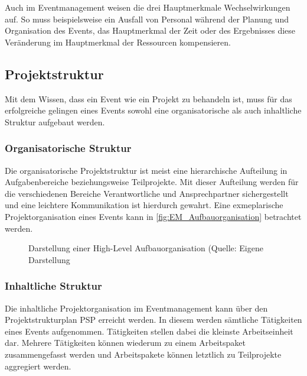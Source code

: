 Auch im Eventmanagement weisen die drei Hauptmerkmale Wechselwirkungen auf.
So muss beispielsweise ein Ausfall von Personal während der Planung und Organisation des Events, das Hauptmerkmal der Zeit oder des Ergebnisses diese Veränderung im Hauptmerkmal der Ressourcen kompensieren. 


\subsection{Projektstruktur}
Mit dem Wissen, dass ein Event wie ein Projekt zu behandeln ist, muss für das erfolgreiche gelingen eines Events sowohl eine organisatorische als auch inhaltliche Struktur aufgebaut werden.

\subsubsection{Organisatorische Struktur}
Die organisatorische Projektstruktur ist meist eine hierarchische Aufteilung in Aufgabenbereiche beziehungsweise Teilprojekte.
Mit dieser Aufteilung werden für die verschiedenen Bereiche Verantwortliche und Ansprechpartner sichergestellt und eine leichtere Kommunikation ist hierdurch gewahrt.
Eine exmeplarische Projektorganisation eines Events kann in \autoref{fig:EM_Aufbauorganisation} betrachtet werden.\autocite[Vgl.][S. 144 f.]{Holzbaur.2002}

\begin{figure}[H]
    \centering
    \setlength{\fboxsep}{10pt}
    \setlength{\fboxrule}{0.5pt}
    \caption[Eventmanagement: Aufbauorganisation]{Darstellung einer High-Level Aufbauorganisation (Quelle: Eigene Darstellung} \label{fig:EM_Aufbauorganisation}
\end{figure}

\subsubsection{Inhaltliche Struktur}
Die inhaltliche Projektorganisation im Eventmanagement kann über den Projektstrukturplan PSP\autocite[]{projektmanagementdefinitionen.de.o.J.} erreicht werden.
In diesem werden sämtliche Tätigkeiten eines Events aufgenommen.
Tätigkeiten stellen dabei die kleinste Arbeitseinheit dar.
Mehrere Tätigkeiten können wiederum zu einem Arbeitspaket zusammengefasst werden und Arbeitspakete können letztlich zu Teilprojekte aggregiert werden.\autocite[Vgl.][S. 144 f.]{Holzbaur.2002}

